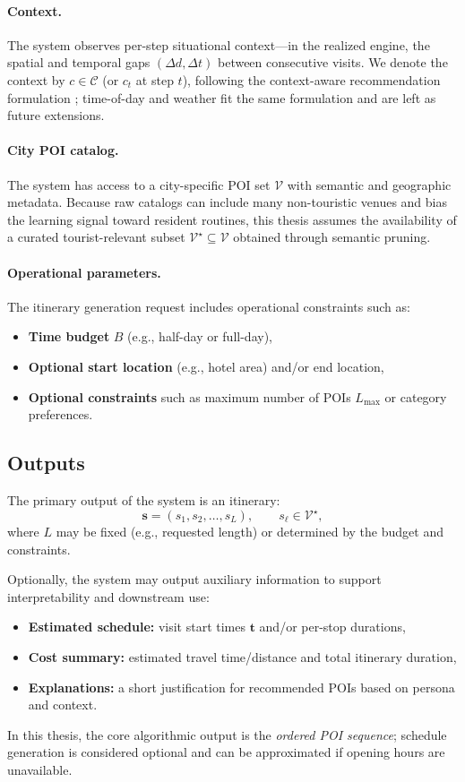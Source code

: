 \paragraph{Context.}
The system observes per-step situational context---in the realized engine, the spatial and temporal gaps $(\Delta d,\Delta t)$ between consecutive visits. We denote the context by $c \in \mathcal{C}$ (or $c_t$ at step $t$), following the context-aware recommendation formulation \citep{adomavicius2005tois, adomavicius2022cars}; time-of-day and weather fit the same formulation and are left as future extensions.

\paragraph{City POI catalog.}
The system has access to a city-specific POI set $\mathcal{V}$ with semantic and geographic metadata. Because raw catalogs can include many non-touristic venues and bias the learning signal toward resident routines, this thesis assumes the availability of a curated tourist-relevant subset $\mathcal{V}^{\star}\subseteq \mathcal{V}$ obtained through semantic pruning.

\paragraph{Operational parameters.}
The itinerary generation request includes operational constraints such as:
\begin{itemize}[leftmargin=*]
    \item \textbf{Time budget} $B$ (e.g., half-day or full-day),
    \item \textbf{Optional start location} (e.g., hotel area) and/or end location,
    \item \textbf{Optional constraints} such as maximum number of POIs $L_{\max}$ or category preferences.
\end{itemize}

\subsection{Outputs}
The primary output of the system is an itinerary:
\[
\mathbf{s} = (s_1, s_2, \dots, s_L), \qquad s_{\ell} \in \mathcal{V}^{\star},
\]
where $L$ may be fixed (e.g., requested length) or determined by the budget and constraints.

Optionally, the system may output auxiliary information to support interpretability and downstream use:
\begin{itemize}[leftmargin=*]
    \item \textbf{Estimated schedule:} visit start times $\mathbf{t}$ and/or per-stop durations,
    \item \textbf{Cost summary:} estimated travel time/distance and total itinerary duration,
    \item \textbf{Explanations:} a short justification for recommended POIs based on persona and context.
\end{itemize}
In this thesis, the core algorithmic output is the \emph{ordered POI sequence}; schedule generation is considered optional and can be approximated if opening hours are unavailable.

